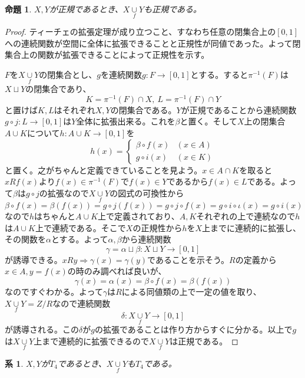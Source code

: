 \documentclass[leqno]{jsarticle}
\newtheorem{prop}[thm]{命題}
\newtheorem{cor}[thm]{系}
\newcommand{\To}{\Longrightarrow}
\newcommand{\qt}[2]{#1/\! #2}
\newcommand{\al}{\alpha}
\newcommand{\be}{\beta}
\newcommand{\ga}{\gamma}
\newcommand{\main}{X\underset{f}{\cup} Y}
\begin{document}
\begin{prop}\label{seiki}
$X,Y$が正規であるとき、$X\underset{f}{\cup} Y$も正規である。
\end{prop}
\begin{proof}
ティーチェの拡張定理が成り立つこと、すなわち任意の閉集合上の$[0,1]$への連続関数が空間に全体に拡張できることと正規性が同値であった。よって閉集合上の関数が拡張できることによって正規性を示す。\par
$F$を$\main$の閉集合とし、$g$を連続関数$g:F\to [0,1]$とする。すると$\pi^{-1}(F)$は$X\sqcup Y$の閉集合であり、
\[
K=\pi^{-1}(F)\cap X,\ L=\pi^{-1}(F)\cap Y
\]
と置けば$K,L$はそれぞれ$X,Y$の閉集合である。$Y$が正規であることから連続関数$g\circ j:L\to[0,1]$は$Y$全体に拡張出来る。これを$\be$と置く。そして$X$上の閉集合$A\cup K$について$h:A\cup K\to[0,1]$を
\[
h(x)=
\begin{cases}
\be \circ f(x) & \text{$(x\in A)$}\\ 
g\circ i(x) & \text{$(x\in K)$}
\end{cases}
\]
と置く。之がちゃんと定義できていることを見よう。$x\in A\cap K$を取ると$xRf(x)$より$f(x)\in \pi^{-1}(F)$で$f(x)\in Y$であるから$f(x)\in L$である。よって$\be$は$g\circ j$の拡張なので$\main$の図式の可換性から
\[
\be \circ f(x)=\be(f(x))=g\circ j(f(x))=g\circ j\circ f(x)=g\circ i\circ \iota(x)=g\circ i(x)
\]
なので$h$はちゃんと$A\cup K$上で定義されており、$A,K$それぞれの上で連続なので$h$は$A\cup K$上で連続である。そこで$X$の正規性から$h$を$X$上までに連続的に拡張し、その関数を$\al$とする。よって$\al,\be$から連続関数
\[
\ga=\al\sqcup \be:X\sqcup Y\to [0,1]
\]
が誘導できる。$xRy\To \ga(x)=\ga(y)$であることを示そう。$R$の定義から$x\in A,y=f(x)$の時のみ調べれば良いが、
\[
\ga(x)=\al(x)=\be\circ f(x)=\be(f(x))
\]
なのですぐわかる。よって$\ga$は$R$による同値類の上で一定の値を取り、$\main=\qt{Z}{R}$なので連続関数
\[
\delta:\main\to [0,1]
\]
が誘導される。この$\delta$が$g$の拡張であることは作り方からすぐに分かる。以上で$g$は$\main$上まで連続的に拡張できるので$\main$は正規である。
\end{proof}

\begin{cor}\label{t4}
$X,Y$が$T_4$であるとき、$X\underset{f}{\cup} Y$も$T_4$である。
\end{cor}
\end{document}
